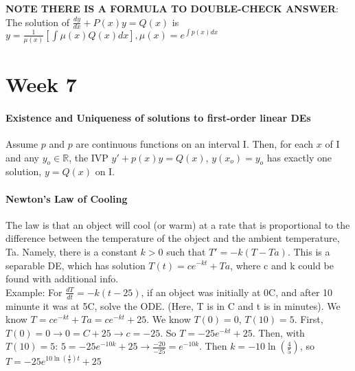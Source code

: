 \documentclass[10pt,letter]{article}
\begin{document}
\textbf{NOTE THERE IS A FORMULA TO DOUBLE-CHECK ANSWER}: The solution of $\frac{dy}{dx}+P(x)y=Q(x)$ is $y = \frac{1}{\mu(x)}\left[\int\mu(x)Q(x)dx\right], \mu(x)=e^{\int p(x)dx}$

\pagebreak

\section*{Week 7}
\paragraph{Existence and Uniqueness of solutions to first-order linear DEs} Assume $p$ and $p$ are continuous functions on an interval I. Then, for each $x$ of I and any $y_o\in\mathbb{R}$, the IVP $y'+p(x)y=Q(x)$, $y(x_o)=y_o$ has exactly one solution, $y=Q(x)$ on I. 

\paragraph{Newton's Law of Cooling} The law is that an object will cool (or warm) at a rate that is proportional to the difference between the temperature of the object and the ambient temperature, Ta. Namely, there is a constant $k>0$ such that $T'=-k(T-Ta)$. This is a separable DE, which has solution $T(t)=ce^{-kt}+Ta$, where c and k could be found with additional info. \\ 
Example: For $\frac{dT}{dt}=-k(t-25)$, if an object was initially at 0\textdegree C, and after 10 minunte it was at 5\textdegree C, solve the ODE. (Here, T is in \textdegree C and t is in minutes). We know $T=ce^{-kt}+Ta=ce^{-kt}+25$. We know $T(0)=0$, $T(10)=5$. First, $T(0)=0\longrightarrow 0 = C +25\longrightarrow c=-25$. So $T=-25e^{-kt}+25$. Then, with $T(10)=5$: $5=-25e^{-10k}+25\longrightarrow \frac{-20}{-25}=e^{-10k}$. Then $k = -10\ln\left(\frac{4}{5}\right)$, so $T = -25e^{10\ln\left(\frac{4}{5}\right)t}+25$
\end{document}
